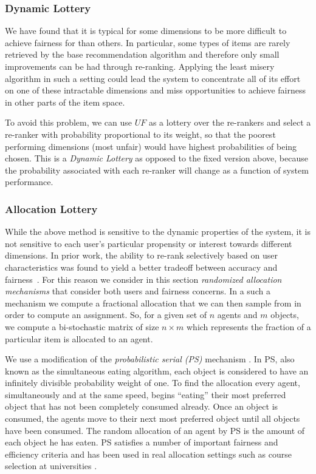 \subsubsection{\textbf{Dynamic Lottery}}
\hfill

We have found that it is typical for some dimensions to be more difficult to achieve fairness for than others. In particular, some types of items are rarely retrieved by the base recommendation algorithm and therefore only small improvements can be had through re-ranking. Applying the least misery algorithm in such a setting could lead the system to concentrate all of its effort on one of these intractable dimensions and miss opportunities to achieve fairness in other parts of the item space. 

To avoid this problem, we can use $UF$ as a lottery over the re-rankers and select a re-ranker with probability proportional to its weight, so that the poorest performing dimensions (most unfair) would have highest probabilities of being chosen. This is a \textit{Dynamic Lottery} as opposed to the fixed version above, because the probability associated with each re-ranker will change as a function of system performance. 

\subsubsection{\textbf{Allocation Lottery}}
\hfill

While the above method is sensitive to the dynamic properties of the system, it is not sensitive to each user's particular propensity or interest towards different dimensions. In prior work, the ability to re-rank selectively based on user characteristics was found to yield a better tradeoff between accuracy and fairness~\cite{liu2019personalized,sonboli-umap-2020}. For this reason we consider in this section \emph{randomized allocation mechanisms} that consider both users and fairness concerns.  In a such a mechanism we compute a fractional allocation that we can then sample from in order to compute an assignment.  So, for a given set of $n$ agents and $m$ objects, we compute a bi-stochastic matrix of size $n \times m$ which represents the fraction of a particular item is allocated to an agent.

We use a modification of the \emph{probabilistic serial (PS)} mechanism \cite{bogomolnaia2001new}.  In PS, also known as the simultaneous eating algorithm, each object is considered to have an infinitely divisible probability weight of one.  To find the allocation every agent, simultaneously and at the same speed, begins ``eating'' their most preferred object that has not been completely consumed already.  Once an object is consumed, the agents move to their next most preferred object until all objects have been consumed. The random allocation of an agent by PS is the amount of each object he has eaten. PS satisfies a number of important fairness and efficiency criteria \cite{Aziz:EqulibriaPS,Aziz:EgalRandom} and has been used in real allocation settings such as course selection at universities \cite{budish2013designing}.

